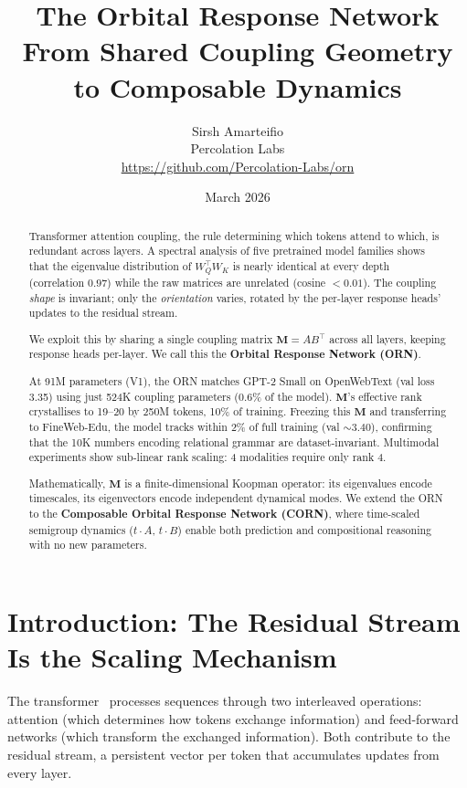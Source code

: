 \documentclass[11pt, a4paper]{article}
\title{%
    \textbf{The Orbital Response Network}\\[0.3em]
    \large From Shared Coupling Geometry to Composable Dynamics%
}
\author{%
    Sirsh Amarteifio\\
    {\small Percolation Labs}\\
    {\small \url{https://github.com/Percolation-Labs/orn}}%
}
\date{March 2026}
\newcommand{\M}{\mathbf{M}}
\theoremstyle{plain}
\theoremstyle{remark}
\begin{document}
\maketitle

\begin{abstract}
Transformer attention coupling, the rule determining which tokens attend to which, is redundant across layers.
A spectral analysis of five pretrained model families shows that the eigenvalue distribution of $W_Q^\top W_K$ is nearly identical at every depth (correlation $0.97$) while the raw matrices are unrelated (cosine $< 0.01$).
The coupling \emph{shape} is invariant; only the \emph{orientation} varies, rotated by the per-layer response heads' updates to the residual stream.

We exploit this by sharing a single coupling matrix $\M = AB^\top$ across all layers, keeping response heads per-layer.
We call this the \textbf{Orbital Response Network (ORN)}.

At 91M parameters (V1), the ORN matches GPT-2 Small on OpenWebText (val loss 3.35) using just 524K coupling parameters (0.6\% of the model).
$\M$'s effective rank crystallises to 19--20 by 250M tokens, 10\% of training.
Freezing this $\M$ and transferring to FineWeb-Edu, the model tracks within 2\% of full training (val ${\sim}3.40$), confirming that the 10K numbers encoding relational grammar are dataset-invariant.
Multimodal experiments show sub-linear rank scaling: 4 modalities require only rank 4.

Mathematically, $\M$ is a finite-dimensional Koopman operator: its eigenvalues encode timescales, its eigenvectors encode independent dynamical modes.
We extend the ORN to the \textbf{Composable Orbital Response Network (CORN)}, where time-scaled semigroup dynamics ($t \cdot A$, $t \cdot B$) enable both prediction and compositional reasoning with no new parameters.
\end{abstract}

\section{Introduction: The Residual Stream Is the Scaling Mechanism}

The transformer~\cite{vaswani2017attention} processes sequences through two interleaved operations: attention (which determines how tokens exchange information) and feed-forward networks (which transform the exchanged information).
Both contribute to the residual stream, a persistent vector per token that accumulates updates from every layer.
\end{document}

